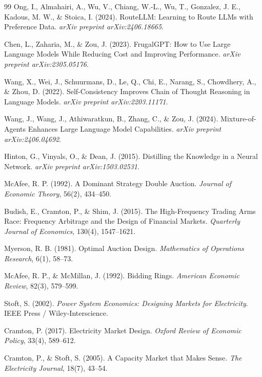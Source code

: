 %

\begin{thebibliography}{99}
   Ong, I., Almahairi, A., Wu, V., Chiang, W.-L.,
    Wu, T., Gonzalez, J. E., Kadous, M. W., \& Stoica, I. (2024).
    RouteLLM: Learning to Route LLMs with Preference Data.
    \textit{arXiv preprint arXiv:2406.18665}.

   Chen, L., Zaharia, M., \& Zou, J. (2023).
    FrugalGPT: How to Use Large Language Models While Reducing Cost and
    Improving Performance. \textit{arXiv preprint arXiv:2305.05176}.

   Wang, X., Wei, J., Schuurmans, D.,
    Le, Q., Chi, E., Narang, S., Chowdhery, A., \& Zhou, D. (2022).
    Self-Consistency Improves Chain of Thought Reasoning in Language
    Models. \textit{arXiv preprint arXiv:2203.11171}.

   Wang, J., Wang, J., Athiwaratkun, B., Zhang, C.,
    \& Zou, J. (2024). Mixture-of-Agents Enhances Large Language Model
    Capabilities. \textit{arXiv preprint arXiv:2406.04692}.

   Hinton, G., Vinyals, O., \& Dean, J. (2015).
    Distilling the Knowledge in a Neural Network.
    \textit{arXiv preprint arXiv:1503.02531}.

   McAfee, R. P. (1992). A Dominant Strategy Double
    Auction. \textit{Journal of Economic Theory}, 56(2), 434--450.

   Budish, E., Cramton, P., \& Shim, J. (2015). The
    High-Frequency Trading Arms Race: Frequency Arbitrage and the Design
    of Financial Markets. \textit{Quarterly Journal of Economics},
    130(4), 1547--1621.

   Myerson, R. B. (1981). Optimal Auction Design.
    \textit{Mathematics of Operations Research}, 6(1), 58--73.

   McAfee, R. P., \& McMillan, J. (1992).
    Bidding Rings. \textit{American Economic Review}, 82(3), 579--599.

   Stoft, S. (2002). \textit{Power System Economics:
    Designing Markets for Electricity}. IEEE Press / Wiley-Interscience.

   Cramton, P. (2017). Electricity Market Design.
    \textit{Oxford Review of Economic Policy}, 33(4), 589--612.

   Cramton, P., \& Stoft, S. (2005). A Capacity
    Market that Makes Sense. \textit{The Electricity Journal}, 18(7),
    43--54.


\end{thebibliography}
